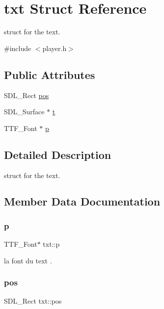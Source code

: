 \hypertarget{structtxt}{}\section{txt Struct Reference}
\label{structtxt}


struct for the text.  




{\ttfamily \#include $<$player.\+h$>$}

\subsection*{Public Attributes}
\begin{DoxyCompactItemize}
\item 
S\+D\+L\+\_\+\+Rect \hyperlink{structtxt_a9d9e7e31ff50673c8ea13b9d4d508ab8}{pos}
\item 
S\+D\+L\+\_\+\+Surface $\ast$ \hyperlink{structtxt_aef6639e1518ba55ba49b1cc0e41b7439}{t}
\item 
T\+T\+F\+\_\+\+Font $\ast$ \hyperlink{structtxt_a7d0867a2e236cf8219d42f30efdc1489}{p}
\end{DoxyCompactItemize}


\subsection{Detailed Description}
struct for the text. 

\subsection{Member Data Documentation}
\mbox{\label{structtxt_a7d0867a2e236cf8219d42f30efdc1489}} 
\subsubsection{\texorpdfstring{p}{p}}
{\footnotesize\ttfamily T\+T\+F\+\_\+\+Font$\ast$ txt\+::p}

la font du text . \mbox{\label{structtxt_a9d9e7e31ff50673c8ea13b9d4d508ab8}} 
\subsubsection{\texorpdfstring{pos}{pos}}
{\footnotesize\ttfamily S\+D\+L\+\_\+\+Rect txt\+::pos}

